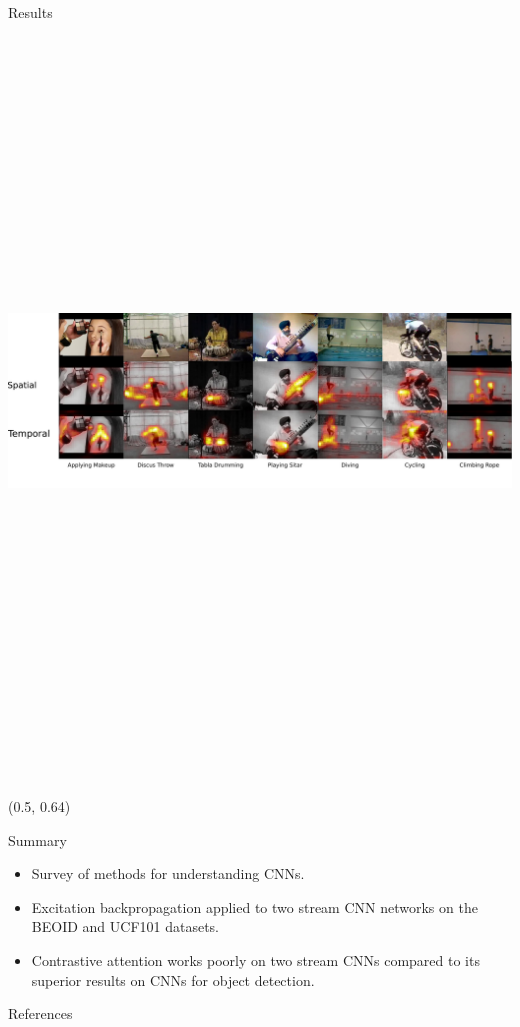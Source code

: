 \documentclass[final]{beamer} %
\begin{document}
\begin{frame}[t]
    \begin{block}{Results}
      \centering
      \includegraphics[keepaspectratio,height=20cm]{media/images/ucf101-ebp-results}
    \end{block}

  \begin{textblock}{0.49}(0.5, 0.64)
    \begin{alertblock}{Summary}
      \begin{itemize}
      \item Survey of methods for understanding CNNs.
      \item Excitation backpropagation applied to two stream CNN networks on the
        BEOID and UCF101 datasets.
      \item Contrastive attention works poorly on two stream CNNs compared to
        its superior results on CNNs for object detection.
      \end{itemize}
    \end{alertblock}

    \begin{block}{References}
    \end{block}
  \end{textblock}
\end{frame}
\end{document}
